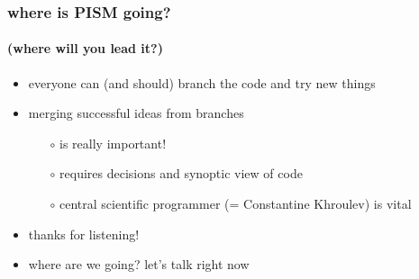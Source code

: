 \documentclass[hide notes,intlimits]{beamer}
\begin{document}
\begin{frame}
  \frametitle{where is PISM going?}
  \framesubtitle{(where will you lead it?)}

\begin{itemize}
  \item everyone can (and should) branch the code and try new things
  \item merging successful ideas from branches
    \begin{itemize}
    \item[$\circ$] is really important!
    \item[$\circ$] requires decisions and synoptic view of code
    \item[$\circ$] central scientific programmer (= Constantine Khroulev) is vital
    \end{itemize}
  \item \alert{thanks for listening!}

\bigskip\bigskip

  \item where are we going?  let's talk right now
\end{itemize}

\end{frame}
\end{document}

